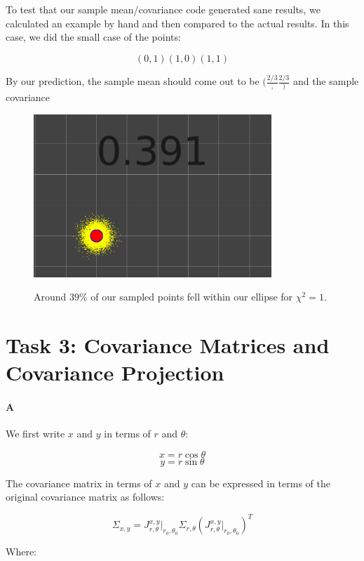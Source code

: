 \documentclass[12pt]{article}
\begin{document}
To test that our sample mean/covariance code generated sane results,
we calculated an example by hand and then compared to the actual results.
In this case, we did the small case of the points:

\[(0,1) (1,0) (1,1)\]

By our prediction, the sample mean should come out to be $(\frac{2/3}, \frac{2/3})$
and the sample covariance

\begin{figure}
\centering
\includegraphics[width=0.8\textwidth]{figures/MultiGaussian_1_sigma.png}
\label{fig:multigaussian}
\caption{Around 39\% of our sampled points fell within our ellipse for $\chi^{2} = 1$.}
\end{figure}
\section{Task 3: Covariance Matrices and Covariance Projection}

\paragraph{A}

We first write $x$ and $y$ in terms of $r$ and $\theta$:

\[x = r\cos\theta\]
\[y = r\sin\theta\]


The covariance matrix in terms of $x$ and $y$ can be expressed in terms of the original covariance matrix as follows:

\[
\Sigma_{x,y} = J_{r,\theta}^{x,y}|_{r_0,\theta_0} \Sigma_{r,\theta}\left(J_{r,\theta}^{x,y}|_{r_0,\theta_0}\right)^T
\]

Where:
\end{document}
